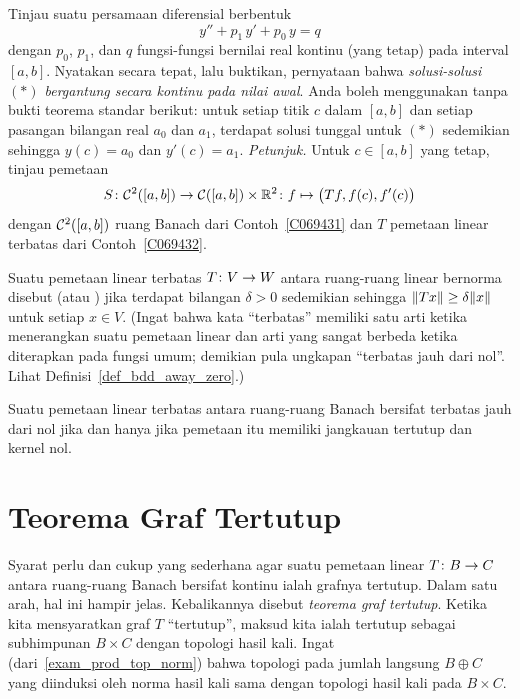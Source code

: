 \begin{exer} Tinjau suatu persamaan diferensial berbentuk
   \[ y'' + p_1\,y' + p_0\,y = q  \tag{$\ast$} \]
dengan $p_0$, $p_1$, dan $q$ fungsi-fungsi bernilai real kontinu (yang tetap) pada interval
$[a,b]$.  Nyatakan secara tepat, lalu buktikan, pernyataan bahwa \emph{solusi-solusi $(\ast)$
bergantung secara kontinu pada nilai awal}.  Anda boleh menggunakan tanpa bukti teorema standar berikut:
untuk setiap titik $c$ dalam $[a,b]$ dan setiap pasangan bilangan real $a_0$ dan $a_1$,
terdapat solusi tunggal untuk $(\ast)$ sedemikian sehingga $y(c) = a_0$ dan $y'(c) = a_1$.
\emph{Petunjuk.} Untuk $c \in [a,b]$ yang tetap, tinjau pemetaan
  \[ S\colon \mathcal{C}^2([a,b]) \rightarrow \mathcal{C}([a,b]) \times \mathbb{R}^2 \colon
                                        f \mapsto \bigl(Tf,f(c),f'(c)\bigr) \]
dengan $\mathcal{C}^2([a,b])$ ruang Banach dari Contoh~\ref{C069431} dan $T$ pemetaan
linear terbatas dari Contoh~\ref{C069432}.
\end{exer}

\begin{defn} Suatu pemetaan linear terbatas $T\colon V \rightarrow W$ antara ruang-ruang linear bernorma disebut
 (atau
) jika terdapat bilangan $\delta > 0$ sedemikian sehingga $\lVert Tx\rVert \ge
\delta\lVert x\rVert$ untuk setiap $x \in V$. (Ingat bahwa kata ``terbatas'' memiliki satu arti ketika
menerangkan suatu pemetaan linear dan arti yang sangat berbeda ketika diterapkan pada fungsi umum;
demikian pula ungkapan ``terbatas jauh dari nol''. Lihat Definisi~\ref{def_bdd_away_zero}.)
\end{defn}

\begin{prop} Suatu pemetaan linear terbatas antara ruang-ruang Banach bersifat terbatas jauh dari nol jika dan
hanya jika pemetaan itu memiliki jangkauan tertutup dan kernel nol.
\end{prop}


















\section{Teorema Graf Tertutup}
Syarat perlu dan cukup yang sederhana agar suatu pemetaan linear $T\colon B \rightarrow C$ antara ruang-ruang Banach
bersifat kontinu ialah grafnya tertutup.  Dalam satu arah, hal ini hampir jelas.  Kebalikannya
disebut \emph{teorema graf tertutup}.  Ketika kita mensyaratkan graf $T$
``tertutup'', maksud kita ialah tertutup sebagai subhimpunan $B \times C$ dengan topologi hasil kali.  Ingat (dari~\ref{exam_prod_top_norm})
bahwa topologi pada jumlah langsung $B \oplus C$ yang diinduksi oleh norma hasil kali sama dengan topologi hasil kali pada $B \times C$.

